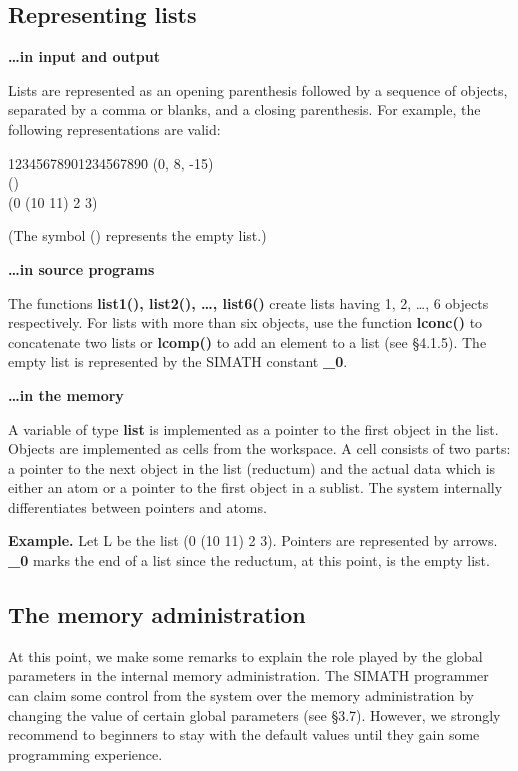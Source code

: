 \newpage

\subsection{Representing lists}
{\bf \ldots in input and output}

Lists are represented as an opening parenthesis followed by a sequence of objects, separated by a comma 
or blanks, and a closing parenthesis. For example, the following representations are valid:
\begin{tabbing}
         12345678901234567890\= \kill  
         \>  (0,   8, -15)\\
         \>       ()\\
         \>       (0 (10 11) 2    3)
\end{tabbing}     
(The symbol () represents the empty list.)

\leer 
{\bf \ldots in source programs}

The functions {\bf list1(),  list2(), \ldots, list6()} create lists having 1, 2, \ldots, 6 objects
respectively. For lists with more than six objects, use the function {\bf lconc()} to concatenate two
lists or {\bf lcomp()} to add an element to a list (see \S 4.1.5). The empty list is represented by the
SIMATH constant {\bf \_0}.

\leer 
{\bf \ldots in the memory}

A variable of type {\bf list} is implemented as a pointer to the first object in the list. Objects
are implemented as cells from the workspace.  A cell consists of two parts: a pointer to the next object in the
list (reductum) and the actual data which is either an atom or a pointer to the first object in a sublist.
The system internally differentiates between pointers and atoms.

\newpage

{\bf Example.}
Let L be the list (0 (10 11) 2 3). Pointers are represented by arrows. {\bf \_0} marks the end of a list
since the reductum, at this point, is the empty list.



\subsection{The memory administration}
At this point, we make some remarks to explain the role played by the global parameters in the internal
memory administration. The SIMATH programmer can claim some control from the system over the memory
administration by changing the value of certain global parameters (see \S 3.7).  However, we strongly recommend
to beginners to stay with the default values until they gain some programming experience.

